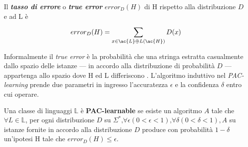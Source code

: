 \begin{description}
\begin{definizione*}Il \textbf{\textit{tasso di errore}} o \textbf{\textit{true error}} $error_{D}(H)$ di \ac{H} rispetto alla distribuzione  $D$ e ad \ac{L} è
\begin{equation*}
    error_{D}(H) = \sum_{x \in \ac{L} \oplus L(\ac{H})}^{}D(x)
\end{equation*}
\end{definizione*}
Informalmente il \textit{true error} è la probabilità che una stringa estratta casualmente dallo spazio delle istanze --- in accordo alla distribuzione di probabilità $D$ --- appartenga allo spazio dove \ac{H} ed \ac{L} differiscono . L'algoritmo induttivo nel \textit{PAC-learning} prende due parametri in ingresso l'accuratezza $\epsilon$ e la confidenza $\delta$ entro cui operare.

\begin{definizione}\label{def:PacL}Una classe di linguaggi $\mathbb{L}$ è \textbf{PAC-learnable} se esiste un algoritmo $A$ tale che $\forall L \in \mathbb{L}$, per ogni distribuzione $D$ su $\Sigma^{*} \text{,} \forall \epsilon(0<\epsilon<1) \text{,} \forall \delta(0<\delta<1), A$ su istanze fornite in accordo alla distribuzione $D$ produce con probabilità $1-\delta$ un'ipotesi \ac{H} tale che $error_{D}(H) \leq \epsilon$.
\end{definizione}
\end{description}

